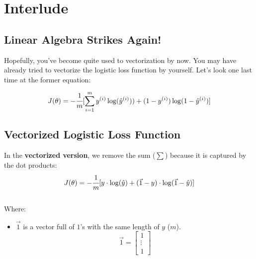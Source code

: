 
\section*{Interlude}
\subsection*{Linear Algebra Strikes Again!}

Hopefully, you've become quite used to vectorization by now.
You may have already tried to vectorize the logistic loss function by yourself.
Let's look one last time at the former equation:

$$
J( \theta) = -\cfrac{1} {m} \lbrack \sum_{i = 1}^{m} y^{(i)}\log(\hat{y}^{(i)})) + (1 - y^{(i)})\log(1 - \hat{y}^{(i)})\rbrack
$$

\subsection*{Vectorized Logistic Loss Function}
In the \textbf{vectorized version}, we remove the sum ($\sum$) because it is captured by the dot products:
$$
J( \theta) = -\cfrac{1} {m} \lbrack y \cdot \log(\hat{y}) + (\vec{1} - y) \cdot \log(\vec{1} - \hat{y})\rbrack
$$
\\
Where:
\begin{itemize}
       \item $\vec{1}$ is a vector full of $1$'s with the same length of $y$ ($m$).
             $$
             \vec{1} = \begin{bmatrix}
                 1 \\
                 \vdots \\
                 1
             \end{bmatrix}
             $$
\end{itemize}

